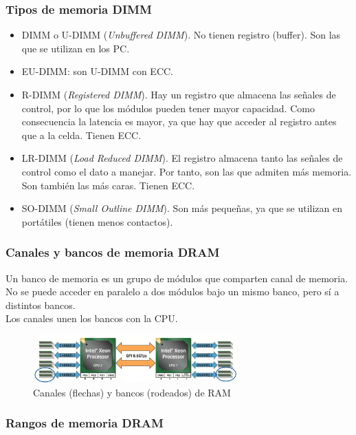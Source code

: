 \documentclass[12pt,spanish]{article}
\begin{document}
\subsubsection{Tipos de memoria DIMM}

\begin{itemize}
	\item DIMM o U-DIMM (\textit{Unbuffered DIMM}). No tienen registro (buffer). Son las que se utilizan en los PC.
	\item EU-DIMM: son U-DIMM con ECC.
	\item R-DIMM (\textit{Registered DIMM}). Hay un registro que almacena las señales de control, por lo que los módulos pueden tener mayor capacidad. Como consecuencia la latencia es mayor, ya que hay que acceder al registro antes que a la celda. Tienen ECC.
	\item LR-DIMM (\textit{Load Reduced DIMM}). El registro almacena tanto las señales de control como el dato a manejar. Por tanto, son las que admiten más memoria. Son también las más caras. Tienen ECC.
	\item SO-DIMM (\textit{Small Outline DIMM}). Son más pequeñas, ya que se utilizan en portátiles (tienen menos contactos).
\end{itemize}

\subsubsection{Canales y bancos de memoria DRAM}

Un banco de memoria es un grupo de módulos que comparten canal de memoria. No se puede acceder en paralelo a dos módulos bajo un mismo banco, pero sí a distintos bancos.\\

Los canales unen los bancos con la CPU.

\begin{figure}[H]
	\centering
	\includegraphics[width=0.7\textwidth]{rambanks.png}
	\caption{Canales (flechas) y bancos (rodeados) de RAM}
\end{figure}

\subsubsection{Rangos de memoria DRAM}
\end{document}
